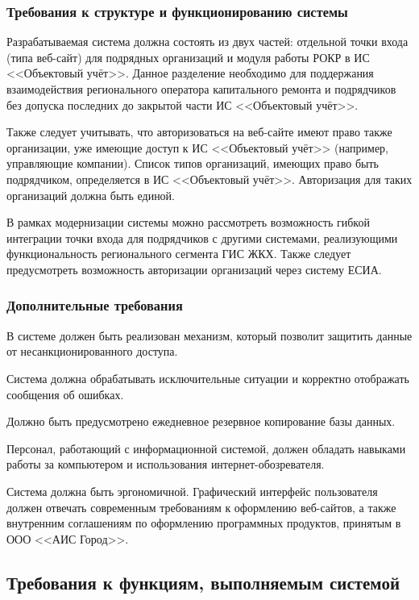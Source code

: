\subsubsection{Требования к структуре и функционированию системы}

Разрабатываемая система должна состоять из двух частей: отдельной точки входа (типа веб-сайт) для подрядных организаций и модуля работы РОКР в ИС <<Объектовый учёт>>.
Данное разделение необходимо для поддержания взаимодействия регионального оператора капитального ремонта и подрядчиков без допуска последних до закрытой части ИС <<Объектовый учёт>>.

Также следует учитывать, что авторизоваться на веб-сайте имеют право также организации, уже имеющие доступ к ИС <<Объектовый учёт>> (например, управляющие компании).
Список типов организаций, имеющих право быть подрядчиком, определяется в ИС <<Объектовый учёт>>.
Авторизация для таких организаций должна быть единой.

В рамках модернизации системы можно рассмотреть возможность гибкой интеграции точки входа для подрядчиков с другими системами, реализующими \linebreak функциональность регионального сегмента ГИС ЖКХ.
Также следует предусмотреть возможность авторизации организаций через систему ЕСИА.

\subsubsection{Дополнительные требования}

В системе должен быть реализован механизм, который позволит защитить данные от несанкционированного доступа.

Система должна обрабатывать исключительные ситуации и корректно отображать сообщения об ошибках.

Должно быть предусмотрено ежедневное резервное копирование базы данных.

Персонал, работающий с информационной системой, должен обладать навыками работы за компьютером и использования интернет-обозревателя.

Система должна быть эргономичной.
Графический интерфейс пользователя должен отвечать современным требованиям к оформлению веб-сайтов, а также внутренним соглашениям по оформлению программных продуктов, принятым в ООО <<АИС Город>>.

\subsection{Требования к функциям, выполняемым системой}

